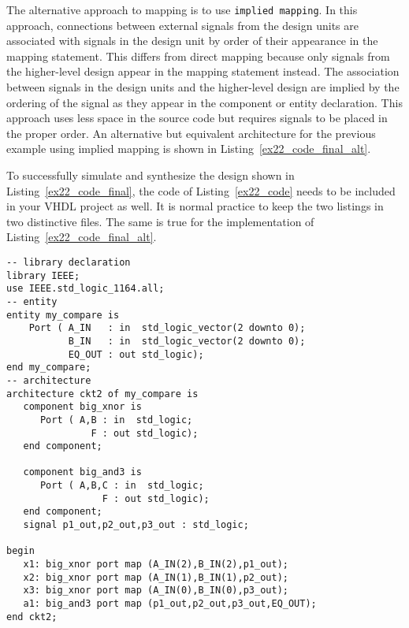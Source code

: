 The alternative approach to mapping is to use \texttt{implied mapping}. In this approach, connections between external signals from the design units are associated with signals in the design unit by order of their appearance in the mapping statement. This differs from direct mapping because only signals from the higher-level design appear in the mapping statement instead. The association between signals in the design units and the higher-level design are implied by the ordering of the signal as they appear in the component or entity declaration. This approach uses less space in the source code but requires signals to be placed in the proper order. An alternative but equivalent architecture for the previous example using implied mapping is shown in Listing~\ref{ex22_code_final_alt}.

To successfully simulate and synthesize the design shown in Listing~\ref{ex22_code_final}, the code of Listing~\ref{ex22_code} needs to be included in your VHDL project as well. It is normal practice to keep the two listings in two distinctive files. The same is true for the implementation of Listing~\ref{ex22_code_final_alt}.

\noindent
\begin{minipage}{0.99\linewidth}
\begin{lstlisting}[label=ex22_code_final_alt, caption=Alternative architecture for Example~22 using implied mapping.]
-- library declaration
library IEEE;
use IEEE.std_logic_1164.all;
-- entity
entity my_compare is
    Port ( A_IN   : in  std_logic_vector(2 downto 0);
           B_IN   : in  std_logic_vector(2 downto 0);
           EQ_OUT : out std_logic);
end my_compare;
-- architecture
architecture ckt2 of my_compare is
   component big_xnor is
      Port ( A,B : in  std_logic;
               F : out std_logic);
   end component;

   component big_and3 is
      Port ( A,B,C : in  std_logic;
                 F : out std_logic);
   end component;
   signal p1_out,p2_out,p3_out : std_logic;

begin
   x1: big_xnor port map (A_IN(2),B_IN(2),p1_out);
   x2: big_xnor port map (A_IN(1),B_IN(1),p2_out);
   x3: big_xnor port map (A_IN(0),B_IN(0),p3_out);
   a1: big_and3 port map (p1_out,p2_out,p3_out,EQ_OUT);
end ckt2;
\end{lstlisting}
\end{minipage}

